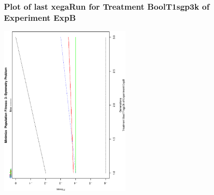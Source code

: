  \begin{frame}
 \frametitle{ Plot of last xegaRun for Treatment BoolT1sgp3k of Experiment ExpB }
 \begin{center}
\includegraphics[width=0.5\textwidth, angle=-90]
{ExpBPlotPopStatsFigure006.eps}
 \end{center}
 \label{report/ExpBPlotPopStatsFigure006.eps}  
 \end{frame}

